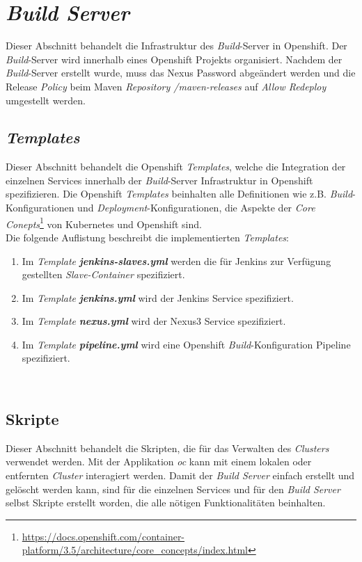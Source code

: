 \section{\emph{Build Server}}
\label{sec:buildserver}
Dieser Abschnitt behandelt die Infrastruktur des \emph{Build}-Server in Openshift. Der \emph{Build}-Server wird innerhalb eines Openshift Projekts organisiert. Nachdem der \emph{Build}-Server erstellt wurde, muss das Nexus Password abgeändert werden und die Release \emph{Policy} beim Maven \emph{Repository /maven-releases} auf \emph{Allow Redeploy} umgestellt werden.
\subsection{\emph{Templates}}
\label{sec:openshift-templates}
Dieser Abschnitt behandelt die Openshift \emph{Templates}, welche die Integration der einzelnen Services innerhalb der \emph{Build}-Server Infrastruktur in Openshift spezifizieren. Die Openshift \emph{Templates} beinhalten alle Definitionen wie z.B. \emph{Build}-Konfigurationen und \emph{Deployment}-Konfigurationen, die Aspekte der \emph{Core Conepts}\footnote{\url{https://docs.openshift.com/container-platform/3.5/architecture/core_concepts/index.html}} von Kubernetes und Openshift sind. \\

Die folgende Auflistung beschreibt die implementierten \emph{Templates}:
\begin{enumerate}
	\item Im \emph{Template} \textbf{\emph{jenkins-slaves.yml}} werden die für Jenkins zur Verfügung gestellten \emph{Slave-Container} spezifiziert.
	\item Im \emph{Template} \textbf{\emph{jenkins.yml}} wird der Jenkins Service spezifiziert.
	\item Im \emph{Template} \textbf{\emph{nexus.yml}} wird der Nexus3 Service spezifiziert.
	\item Im \emph{Template} \textbf{\emph{pipeline.yml}} wird eine Openshift \emph{Build}-Konfiguration Pipeline spezifiziert.
\end{enumerate}

\ \subsection{Skripte}
Dieser Abschnitt behandelt die Skripten, die für das Verwalten des \emph{Clusters} verwendet werden. Mit der Applikation \emph{oc} kann mit einem lokalen oder entfernten \emph{Cluster} interagiert werden. Damit der \emph{Build Server} einfach erstellt und gelöscht werden kann, sind für die einzelnen Services und für den \emph{Build Server} selbst
Skripte erstellt worden, die alle nötigen Funktionalitäten beinhalten.\\

